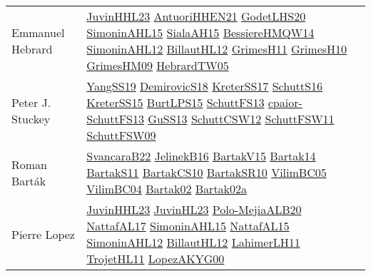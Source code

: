 {\begin{longtable}{p{4cm}p{20cm}}
Emmanuel Hebrard & \href{papers/JuvinHHL23.pdf}{JuvinHHL23}\cite{JuvinHHL23} \href{papers/AntuoriHHEN21.pdf}{AntuoriHHEN21}\cite{AntuoriHHEN21} \href{papers/GodetLHS20.pdf}{GodetLHS20}\cite{GodetLHS20} \href{articles/SimoninAHL15.pdf}{SimoninAHL15}\cite{SimoninAHL15} \href{papers/SialaAH15.pdf}{SialaAH15}\cite{SialaAH15} \href{papers/BessiereHMQW14.pdf}{BessiereHMQW14}\cite{BessiereHMQW14} \href{papers/SimoninAHL12.pdf}{SimoninAHL12}\cite{SimoninAHL12} \href{papers/BillautHL12.pdf}{BillautHL12}\cite{BillautHL12} \href{papers/GrimesH11.pdf}{GrimesH11}\cite{GrimesH11} \href{papers/GrimesH10.pdf}{GrimesH10}\cite{GrimesH10} \href{papers/GrimesHM09.pdf}{GrimesHM09}\cite{GrimesHM09} \href{papers/HebrardTW05.pdf}{HebrardTW05}\cite{HebrardTW05} \\
Peter J. Stuckey & \href{papers/YangSS19.pdf}{YangSS19}\cite{YangSS19} \href{papers/DemirovicS18.pdf}{DemirovicS18}\cite{DemirovicS18} \href{articles/KreterSS17.pdf}{KreterSS17}\cite{KreterSS17} \href{papers/SchuttS16.pdf}{SchuttS16}\cite{SchuttS16} \href{papers/KreterSS15.pdf}{KreterSS15}\cite{KreterSS15} \href{papers/BurtLPS15.pdf}{BurtLPS15}\cite{BurtLPS15} \href{papers/SchuttFS13.pdf}{SchuttFS13}\cite{SchuttFS13} \href{papers/cpaior-SchuttFS13.pdf}{cpaior-SchuttFS13}\cite{cpaior-SchuttFS13} \href{papers/GuSS13.pdf}{GuSS13}\cite{GuSS13} \href{papers/SchuttCSW12.pdf}{SchuttCSW12}\cite{SchuttCSW12} \href{articles/SchuttFSW11.pdf}{SchuttFSW11}\cite{SchuttFSW11} \href{papers/SchuttFSW09.pdf}{SchuttFSW09}\cite{SchuttFSW09} \\
Roman Bart{\'{a}}k & \href{}{SvancaraB22}\cite{SvancaraB22} \href{papers/JelinekB16.pdf}{JelinekB16}\cite{JelinekB16} \href{}{BartakV15}\cite{BartakV15} \href{}{Bartak14}\cite{Bartak14} \href{articles/BartakS11.pdf}{BartakS11}\cite{BartakS11} \href{articles/BartakCS10.pdf}{BartakCS10}\cite{BartakCS10} \href{articles/BartakSR10.pdf}{BartakSR10}\cite{BartakSR10} \href{articles/VilimBC05.pdf}{VilimBC05}\cite{VilimBC05} \href{papers/VilimBC04.pdf}{VilimBC04}\cite{VilimBC04} \href{papers/Bartak02.pdf}{Bartak02}\cite{Bartak02} \href{papers/Bartak02a.pdf}{Bartak02a}\cite{Bartak02a} \\
Pierre Lopez & \href{papers/JuvinHHL23.pdf}{JuvinHHL23}\cite{JuvinHHL23} \href{papers/JuvinHL23.pdf}{JuvinHL23}\cite{JuvinHL23} \href{}{Polo-MejiaALB20}\cite{Polo-MejiaALB20} \href{articles/NattafAL17.pdf}{NattafAL17}\cite{NattafAL17} \href{articles/SimoninAHL15.pdf}{SimoninAHL15}\cite{SimoninAHL15} \href{articles/NattafAL15.pdf}{NattafAL15}\cite{NattafAL15} \href{papers/SimoninAHL12.pdf}{SimoninAHL12}\cite{SimoninAHL12} \href{papers/BillautHL12.pdf}{BillautHL12}\cite{BillautHL12} \href{papers/LahimerLH11.pdf}{LahimerLH11}\cite{LahimerLH11} \href{articles/TrojetHL11.pdf}{TrojetHL11}\cite{TrojetHL11} \href{articles/LopezAKYG00.pdf}{LopezAKYG00}\cite{LopezAKYG00} \\

\end{longtable}}
